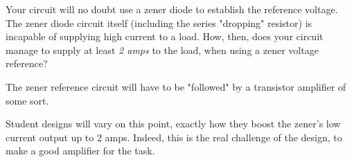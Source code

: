 

Your circuit will no doubt use a zener diode to establish the reference voltage.  The zener diode circuit itself (including the series "dropping" resistor) is incapable of supplying high current to a load.  How, then, does your circuit manage to supply at least {\it 2 amps} to the load, when using a zener voltage reference?







The zener reference circuit will have to be "followed" by a transistor amplifier of some sort.







Student designs will vary on this point, exactly how they boost the zener's low current output up to 2 amps.  Indeed, this is the real challenge of the design, to make a good amplifier for the task.



